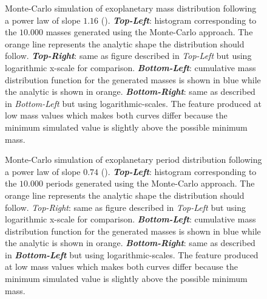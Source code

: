 \begin{figure}[!ht]
\centering
\caption{\scriptsize{Monte-Carlo simulation of exoplanetary mass distribution following a power law of slope $1.16$  (\citeyear{2010EAS....41..107N}). \textit{\textbf{Top-Left}}: histogram corresponding to the $10.000$ masses generated using the Monte-Carlo approach. The orange line represents the analytic shape the distribution should follow. \textit{\textbf{Top-Right}}: same as figure described in \textit{Top-Left} but using logarithmic x-scale for comparison. \textit{\textbf{Bottom-Left}}: cumulative mass distribution function for the generated masses is shown in blue while the analytic is shown in orange. \textit{\textbf{Bottom-Right}}: same as described in \textit{Bottom-Left} but using logarithmic-scales. The feature produced at low mass values which makes both curves differ because the minimum simulated value is slightly above the possible minimum mass.%
}}
\label{fig:Mass_Nielsen}
\end{figure}

\begin{figure}[!ht]
\centering
\caption{\scriptsize{Monte-Carlo simulation of exoplanetary period distribution following a power law of slope $0.74$  (\citeyear{2010EAS....41..107N}). \textit{\textbf{Top-Left}}: histogram corresponding to the $10.000$ periods generated using the Monte-Carlo approach. The orange line represents the analytic shape the distribution should follow. \textit{Top-Right}: same as figure described in \textit{Top-Left} but using logarithmic x-scale for comparison. \textit{\textbf{Bottom-Left}}: cumulative mass distribution function for the generated masses is shown in blue while the analytic is shown in orange. \textit{\textbf{Bottom-Right}}: same as described in \textit{\textbf{Bottom-Left}} but using logarithmic-scales. The feature produced at low mass values which makes both curves differ because the minimum simulated value is slightly above the possible minimum mass.%
}}
\label{fig:Period_Nielsen}
\end{figure}

